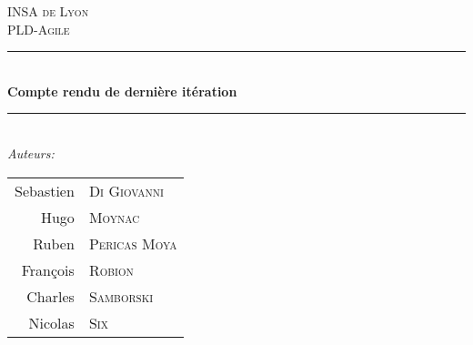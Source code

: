 \newcommand{\HRule}{\rule{\linewidth}{0.5mm}} %

  \center %
   

  \textsc{\LARGE INSA de Lyon}\\[1.5cm] %
  \textsc{\Large PLD-Agile}\\[0.5cm] %


  \HRule \\[0.4cm]
  { \huge \bfseries Compte rendu de dernière itération}\\[0.4cm] %
  \HRule \\[1.5cm]
   

  \Large \emph{Auteurs:}\\[1cm]
  \begin{table}[h]
    \begin{center}
      \begin{tabular}{r l}
         Sebastien & \textsc{Di Giovanni} \\
         Hugo & \textsc{Moynac} \\
         Ruben & \textsc{Pericas Moya} \\
         François & \textsc{Robion} \\
         Charles & \textsc{Samborski} \\
         Nicolas & \textsc{Six} \\[3cm]
      \end{tabular}
    \end{center}
  \end{table}
  

